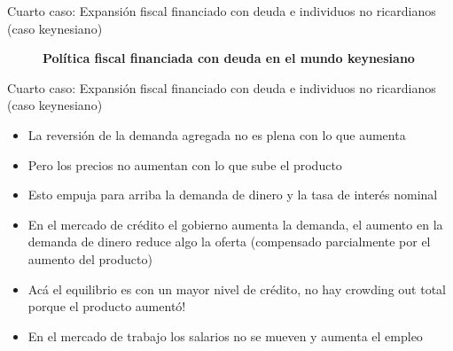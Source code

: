 \documentclass{beamer}
\begin{document}
\begin{frame}{Cuarto caso: Expansión fiscal financiado con deuda e individuos no ricardianos (caso keynesiano)}
\begin{center}
\begin{figure}[H]
\begin{center}
\end{center}
\vspace{0.7cm}
\caption{\textbf{Política fiscal financiada con deuda en el mundo keynesiano}}
\label{fig:C36.7}
\end{figure}
\end{center}
\end{frame}

\begin{frame}{Cuarto caso: Expansión fiscal financiado con deuda e individuos no ricardianos (caso keynesiano)}
   
   \begin{itemize}
       \item La reversión de la demanda agregada no es plena con lo que aumenta 
       \item Pero los precios no aumentan con lo que sube el producto
       \item Esto empuja para arriba la demanda de dinero y la tasa de interés nominal
        \item En el mercado de crédito el gobierno aumenta la demanda, el aumento en la demanda de dinero reduce algo la oferta (compensado parcialmente por el aumento del producto) 
        \item Acá el equilibrio es con un mayor nivel de crédito, no hay crowding out total porque el producto aumentó! 
         \item En el mercado de trabajo los salarios no se mueven y aumenta el empleo  
   \end{itemize}
    
\end{frame}
\end{document}
